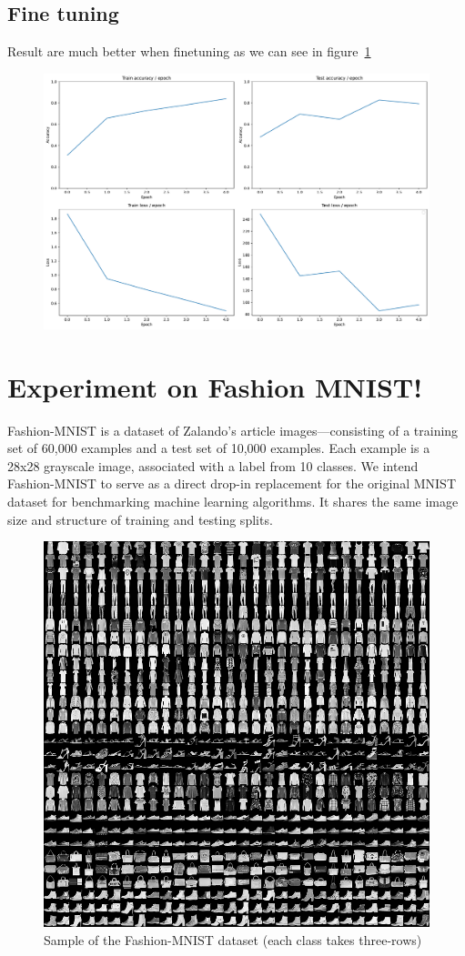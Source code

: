 \subsection{Fine tuning}
Result are much better when finetuning as we can see in figure~\ref{fig:stats_vit_pretrained}
\begin{figure}[H]
    \centering
    \includegraphics*[width=\textwidth]{figs/Transformers/stats_vit_pretrained.pdf}
    \caption{}
    \label{fig:stats_vit_pretrained}
\end{figure}

\section{Experiment on Fashion MNIST!}
Fashion-MNIST is a dataset of Zalando's article images—consisting of a training set of 60,000 examples and a test set of 10,000 examples. Each example is a 28x28 grayscale image, associated with a label from 10 classes. We intend Fashion-MNIST to serve as a direct drop-in replacement for the original MNIST dataset for benchmarking machine learning algorithms. It shares the same image size and structure of training and testing splits.

\begin{figure}[H]
    \centering
    \includegraphics*[width=.5\textwidth]{figs/Transformers/fashion-mnist-sprite.png}
    \caption{Sample of the Fashion-MNIST dataset (each class takes three-rows)}
\end{figure}

